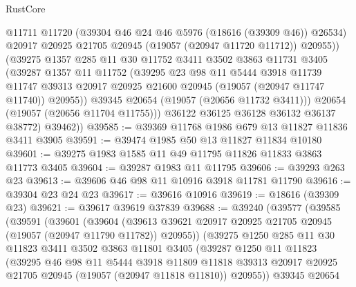 \begin{lexlean}{RustCore}
\begin{coremodule}
                @11711
                @11720
                (@39304 @46 @24 @46 @5976 (@18616 (@39309 @46)) @26534)
                @20917
                @20925
                @21705
                @20945
                (@19057 (@20947 @11720 @11712))
                @20955))
            (@39275
              @1357
              @285
              @11
              @30
              @11752
              @3411
              @3502
              @3863
              @11731
              @3405
              (@39287
                @1357
                @11
                @11752
                (@39295
                  @23
                  @98
                  @11
                  @5444
                  @3918
                  @11739
                  @11747
                  @39313
                  @20917
                  @20925
                  @21600
                  @20945
                  (@19057 (@20947 @11747 @11740))
                  @20955))
              @39345
              @20654
              (@19057 (@20656 @11732 @3411)))
            @20654
            (@19057 (@20656 @11704 @11755)))
          @36122
          @36125
          @36128
          @36132
          @36137
          @38772)
        @39462))
@39585 := @39369 @11768 @1986 @679 @13 @11827 @11836 @3411 @3905
@39591 := @39474 @1985 @50 @13 @11827 @11834 @10180
@39601 := @39275 @1983 @1585 @11 @49 @11795 @11826 @11833 @3863 @11773 @3405
@39604 := @39287 @1983 @11 @11795
@39606 := @39293 @263 @23
@39613 := @39606 @46 @98 @11 @10916 @3918 @11781 @11790
@39616 := @39304 @23 @24 @23
@39617 := @39616 @10916
@39619 := @18616 (@39309 @23)
@39621 := @39617 @39619 @37839
@39688 := @39240
    (@39577
      (@39585
        (@39591
          (@39601
            (@39604
              (@39613 @39621 @20917 @20925 @21705 @20945 (@19057 (@20947 @11790 @11782)) @20955))
            (@39275
              @1250
              @285
              @11
              @30
              @11823
              @3411
              @3502
              @3863
              @11801
              @3405
              (@39287
                @1250
                @11
                @11823
                (@39295
                  @46
                  @98
                  @11
                  @5444
                  @3918
                  @11809
                  @11818
                  @39313
                  @20917
                  @20925
                  @21705
                  @20945
                  (@19057 (@20947 @11818 @11810))
                  @20955))
              @39345
              @20654

\end{coremodule}
\end{lexlean}
